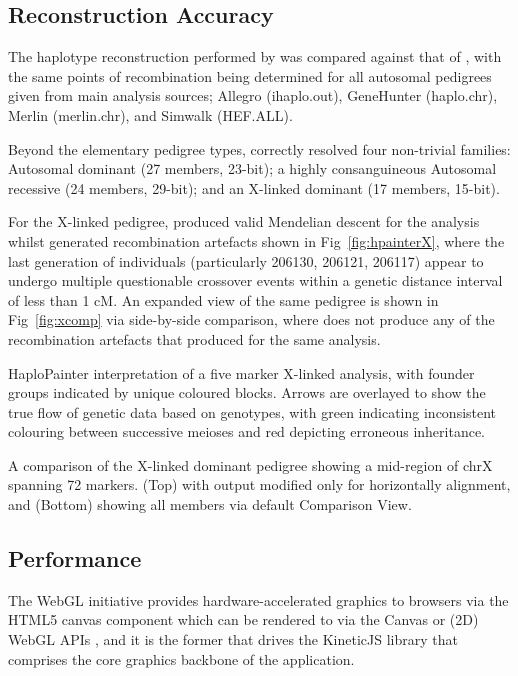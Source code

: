 \subsection{Reconstruction Accuracy}

The haplotype reconstruction performed by \app was compared against that of \app, with the same points of recombination being determined for all autosomal pedigrees given from main analysis sources; Allegro (ihaplo.out), GeneHunter (haplo.chr), Merlin (merlin.chr), and Simwalk (HEF.ALL).

Beyond the elementary pedigree types, \app correctly resolved four non-trivial families: Autosomal dominant (27 members, 23-bit); a highly consanguineous Autosomal recessive (24 members, 29-bit); and an X-linked dominant (17 members, 15-bit).

For the X-linked pedigree, \app produced valid Mendelian descent for the analysis whilst \app generated recombination artefacts shown in Fig~\ref{fig:hpainterX}, where the last generation of individuals (particularly 206130, 206121, 206117) appear to undergo multiple questionable crossover events within a genetic distance interval of less than 1 cM. An expanded view of the same pedigree is shown in Fig~\ref{fig:xcomp} via side-by-side comparison, where \app does not produce any of the recombination artefacts that \app produced for the same analysis.

	{HaploPainter interpretation of a five marker X-linked analysis, with founder groups indicated by unique coloured blocks. Arrows are overlayed to show the true flow of genetic data based on genotypes, with green indicating inconsistent colouring between successive meioses and red depicting erroneous inheritance.
}


	{A comparison of the X-linked dominant pedigree showing a mid-region of chrX spanning 72 markers.
(Top) \app with output modified only for horizontally alignment, and (Bottom) \app showing all members via default Comparison View.}


\subsection{Performance}

The WebGL initiative provides hardware-accelerated graphics to browsers via the HTML5 canvas component which can be rendered to via the Canvas or (2D) WebGL APIs \citep{whatwgliving}, and it is the former that drives the KineticJS library that comprises the core graphics backbone of the application.


